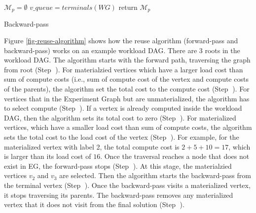 \begin{algorithm}[h]
$\mathcal{M}_p = \emptyset$\;
$v\_queue = terminals(WG)$\;
return $\mathcal{M}_p$\;
\caption{Backward-pass}\label{backward-pass}
\end{algorithm}

Figure \ref{fig-reuse-algorithm} shows how the reuse algorithm (forward-pass and backward-pass) works on an example workload DAG.
There are 3 roots in the workload DAG.
The algorithm starts with the forward path, traversing the graph from root (Step \textcircled{}).
For materialzied vertices which have a larger load cost than sum of compute costs (i.e., sum of compute cost of the vertex and compute costs of the parents), the algorithm set the total cost to the compute cost (Step \textcircled{}).
For vertices that in the Experiment Graph but are unmaterialized, the algorithm has to select compute (Step \textcircled{}).
If a vertex is already computed inside the workload DAG, then the algorithm sets its total cost to zero (Step \textcircled{}).
For materialized vertices, which have a smaller load cost than sum of compute costs, the algorithm sets the total cost to the load cost of the vertex (Step \textcircled{}).
For example, for the materialized vertex with label 2, the total compute cost is $2 + 5 + 10 = 17$, which is larger than its load cost of $16$.
Once the traversal reaches a node that does not exist in EG, the forward-pass stops (Step \textcircled{}).
At this stage, the materialzied vertices $v_2$ and $v_3$ are selected.
Then the algorithm starts the backward-pass from the terminal vertex (Step \textcircled{}).
Once the backward-pass visits a materialized vertex, it stops traversing its parents.
The backward-pass removes any materialized vertex that it does not visit from the final solution (Step \textcircled{}).

